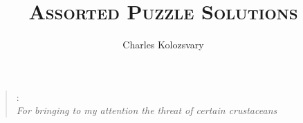 \documentclass{book}
\begin{document}
\title{{\centering\Huge\textsc{Assorted Puzzle Solutions}}}
\author{\Large Charles Kolozsvary}
\date{}

\maketitle

\begin{quote}
{: \\ 
\hfill {\sl For bringing to my attention the threat of certain crustaceans}}
\end{quote}
\end{document}
